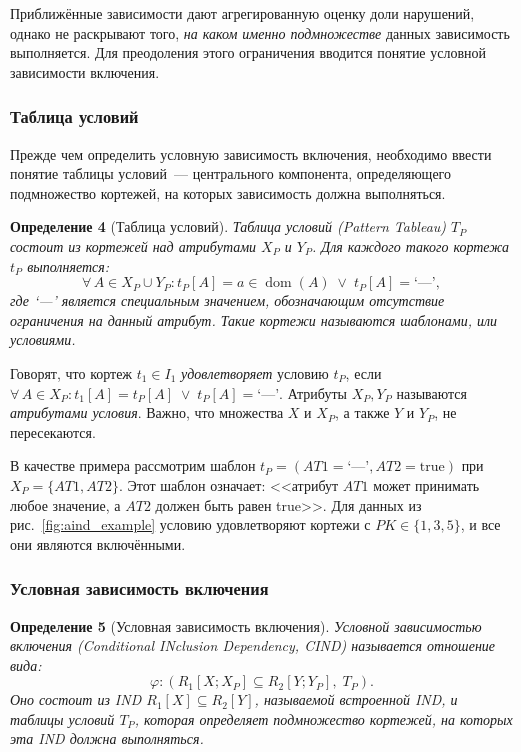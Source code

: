 Приближённые зависимости дают агрегированную оценку доли нарушений, однако не раскрывают того, \emph{на каком именно подмножестве} данных зависимость выполняется. Для преодоления этого ограничения вводится понятие условной зависимости включения.

\subsubsection{Таблица условий}

Прежде чем определить условную зависимость включения, необходимо ввести понятие таблицы условий~--- центрального компонента, определяющего подмножество кортежей, на которых зависимость должна выполняться.

\textbf{Определение 4} (Таблица условий). \emph{Таблица условий (Pattern Tableau) $T_P$ состоит из кортежей над атрибутами $X_P$ и $Y_P$. Для каждого такого кортежа $t_P$ выполняется:}
\[
\forall\, A \in X_P \cup Y_P : t_P[A] = a \in \operatorname{dom}(A) \;\lor\; t_P[A] = \text{`---'},
\]
\emph{где `---' является специальным значением, обозначающим отсутствие ограничения на данный атрибут. Такие кортежи называются шаблонами, или условиями.}

Говорят, что кортеж $t_1 \in I_1$ \emph{удовлетворяет} условию $t_P$, если $\forall\, A \in X_P : t_1[A] = t_P[A] \;\lor\; t_P[A] = \text{`---'}$. Атрибуты $X_P, Y_P$ называются \emph{атрибутами условия}. Важно, что множества $X$ и $X_P$, а также $Y$ и $Y_P$, не пересекаются.

В качестве примера рассмотрим шаблон $t_P = (\mathit{AT1} = \text{`---'}, \mathit{AT2} = \text{true})$ при $X_P = \{\mathit{AT1}, \mathit{AT2}\}$. Этот шаблон означает: <<атрибут $\mathit{AT1}$ может принимать любое значение, а $\mathit{AT2}$ должен быть равен true>>. Для данных из рис.~\ref{fig:aind_example} условию удовлетворяют кортежи с $\mathit{PK} \in \{1, 3, 5\}$, и все они являются включёнными.

\subsubsection{Условная зависимость включения}

\textbf{Определение 5} (Условная зависимость включения). \emph{Условной зависимостью включения (Conditional INclusion Dependency, CIND) называется отношение вида:}
\[
\varphi : (R_1[X; X_P] \subseteq R_2[Y; Y_P],\; T_P).
\]
\emph{Оно состоит из IND $R_1[X] \subseteq R_2[Y]$, называемой встроенной IND, и таблицы условий $T_P$, которая определяет подмножество кортежей, на которых эта IND должна выполняться.}

